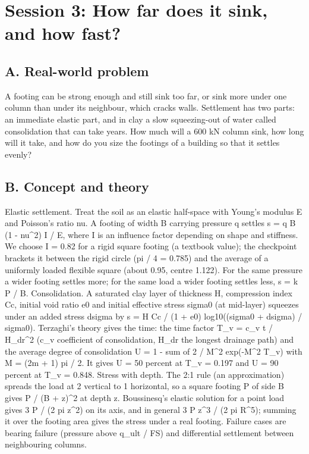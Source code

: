 \documentclass[11pt,a4paper]{article}
\begin{document}
\section{Session 3: How far does it sink, and how fast?}

\subsection*{A. Real-world problem}
A footing can be strong enough and still sink too far, or sink more under one column than under its neighbour, which cracks walls. Settlement has two parts: an immediate elastic part, and in clay a slow squeezing-out of water called consolidation that can take years. How much will a 600 kN column sink, how long will it take, and how do you size the footings of a building so that it settles evenly?

\subsection*{B. Concept and theory}
Elastic settlement. Treat the soil as an elastic half-space with Young's modulus E and Poisson's ratio nu. A footing of width B carrying pressure q settles s = q B (1 - nu\textasciicircum{}2) I / E, where I is an influence factor depending on shape and stiffness. We choose I = 0.82 for a rigid square footing (a textbook value); the checkpoint brackets it between the rigid circle (pi / 4 = 0.785) and the average of a uniformly loaded flexible square (about 0.95, centre 1.122). For the same pressure a wider footing settles more; for the same load a wider footing settles less, s = k P / B. Consolidation. A saturated clay layer of thickness H, compression index Cc, initial void ratio e0 and initial effective stress sigma0 (at mid-layer) squeezes under an added stress dsigma by s = H Cc / (1 + e0) log10((sigma0 + dsigma) / sigma0). Terzaghi's theory gives the time: the time factor T\_v = c\_v t / H\_dr\textasciicircum{}2 (c\_v coefficient of consolidation, H\_dr the longest drainage path) and the average degree of consolidation U = 1 - sum of 2 / M\textasciicircum{}2 exp(-M\textasciicircum{}2 T\_v) with M = (2m + 1) pi / 2. It gives U = 50 percent at T\_v = 0.197 and U = 90 percent at T\_v = 0.848. Stress with depth. The 2:1 rule (an approximation) spreads the load at 2 vertical to 1 horizontal, so a square footing P of side B gives P / (B + z)\textasciicircum{}2 at depth z. Boussinesq's elastic solution for a point load gives 3 P / (2 pi z\textasciicircum{}2) on its axis, and in general 3 P z\textasciicircum{}3 / (2 pi R\textasciicircum{}5); summing it over the footing area gives the stress under a real footing. Failure cases are bearing failure (pressure above q\_ult / FS) and differential settlement between neighbouring columns.
\end{document}
